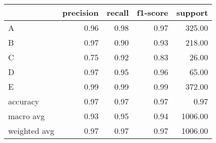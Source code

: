 \begin{tabular}{|l|r|r|r|r|}
\hline
{} &  precision &  recall &  f1-score &  support \\
\hline
A            &       0.96 &    0.98 &      0.97 &   325.00 \\
B            &       0.97 &    0.90 &      0.93 &   218.00 \\
C            &       0.75 &    0.92 &      0.83 &    26.00 \\
D            &       0.97 &    0.95 &      0.96 &    65.00 \\
E            &       0.99 &    0.99 &      0.99 &   372.00 \\
accuracy     &       0.97 &    0.97 &      0.97 &     0.97 \\
macro avg    &       0.93 &    0.95 &      0.94 &  1006.00 \\
weighted avg &       0.97 &    0.97 &      0.97 &  1006.00 \\
\hline
\end{tabular}
